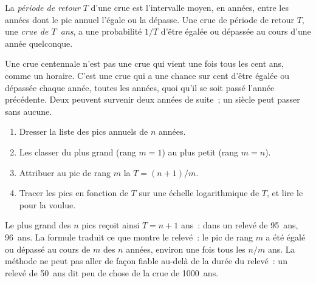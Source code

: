 \begin{definition}\label{def:g10:drainage-basins:return-period}
La \emph{période de retour} $T$
d'une crue est l'intervalle moyen, en années, entre les années dont le pic
annuel l'égale ou la dépasse. Une crue de période de retour $T$, une
\emph{crue de $T$~ans}, a une probabilité $1/T$ d'être égalée ou dépassée
au cours d'une année quelconque.
\end{definition}

Une crue centennale n'est pas une crue qui vient une fois tous les cent ans,
comme un horaire. C'est une crue qui a une chance sur cent d'être égalée ou
dépassée chaque année, toutes les années, quoi qu'il se soit passé l'année
précédente. Deux peuvent survenir deux années de suite~; un siècle peut
passer sans aucune.

\begin{method}\label{met:g10:drainage-basins:return-periods}
\begin{enumerate}
  \item Dresser la liste des pics annuels de $n$ années.
  \item Les classer du plus grand (rang $m = 1$) au plus petit
        (rang $m = n$).
  \item Attribuer au pic de rang $m$ la  $T = (n + 1)/m$.
  \item Tracer les pics en fonction de $T$ sur une échelle logarithmique de
        $T$, et lire le  pour la  voulue.
\end{enumerate}
\end{method}

Le plus grand des $n$ pics reçoit ainsi $T = n + 1$ ans~: dans un relevé de
\num{95}~ans, \num{96}~ans. La formule traduit ce que montre le relevé~:
le pic de rang $m$ a été égalé ou dépassé au cours de $m$ des $n$ années,
environ une fois tous les $n/m$ ans. La méthode ne peut pas aller de façon
fiable au-delà de la durée du relevé~: un relevé de \num{50}~ans dit peu de
chose de la crue de \num{1000}~ans.

